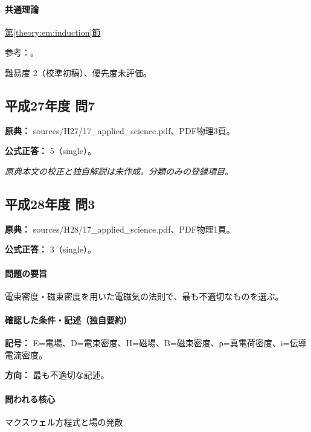 \paragraph{共通理論} \hyperref[theory:em:induction]{第\ref*{theory:em:induction}節}

\par 参考：\cite{mit_em10}。

\par 難易度 2（校準初稿）、優先度未評価。

\subsection{平成27年度 問7}
\label{q:h27-reg-applied-07}

\noindent\textbf{原典：} sources/H27/17\_applied\_science.pdf、PDF物理3頁。

\textbf{公式正答：} 5（single）。

\par\textit{原典本文の校正と独自解説は未作成。分類のみの登録項目。}

\subsection{平成28年度 問3}
\label{q:h28-reg-applied-03}

\noindent\textbf{原典：} sources/H28/17\_applied\_science.pdf、PDF物理1頁。

\textbf{公式正答：} 3（single）。

\paragraph{問題の要旨} 電束密度・磁束密度を用いた電磁気の法則で、最も不適切なものを選ぶ。

\paragraph{確認した条件・記述（独自要約）}\mbox{}\par

\noindent\textbf{記号：} E=電場、D=電束密度、H=磁場、B=磁束密度、ρ=真電荷密度、i=伝導電流密度。\par

\noindent\textbf{方向：} 最も不適切な記述。\par

\paragraph{問われる核心} マクスウェル方程式と場の発散

